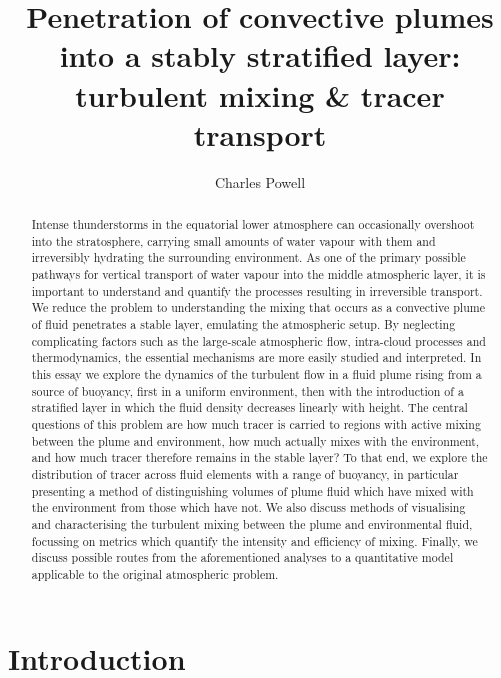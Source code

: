 \documentclass[a4paper]{article}
\title{\bf Penetration of convective plumes into a stably stratified layer: turbulent mixing \& tracer
	transport}
\author{Charles Powell}
\begin{document}
\maketitle

\begin{abstract}
	Intense thunderstorms in the equatorial lower atmosphere can occasionally overshoot into the stratosphere,
	carrying small amounts of water vapour with them and irreversibly hydrating the surrounding environment.
	As one of the primary possible pathways for vertical transport of water vapour into the middle atmospheric
	layer, it is important to understand and quantify the processes resulting in irreversible transport. We
	reduce the problem to understanding the mixing that occurs as a convective plume of fluid penetrates a
	stable layer, emulating the atmospheric setup.  By neglecting complicating factors such as the large-scale
	atmospheric flow, intra-cloud processes and thermodynamics, the essential mechanisms are more easily
	studied and interpreted. In this essay we explore the dynamics of the turbulent flow in a fluid plume
	rising from a source of buoyancy, first in a uniform environment, then with the introduction of a
	stratified layer in which the fluid density decreases linearly with height. The central questions of this
	problem are how much tracer is carried to regions with active mixing between the plume and environment,
	how much actually mixes with the environment, and how much tracer therefore remains in the stable layer?
	To that end, we explore the distribution of tracer across fluid elements with a range of buoyancy, in
	particular presenting a method of distinguishing volumes of plume fluid which have mixed with the
	environment from those which have not. We also discuss methods of visualising and characterising the
	turbulent mixing between the plume and environmental fluid, focussing on metrics which quantify the
	intensity and efficiency of mixing. Finally, we discuss possible routes from the aforementioned analyses
	to a quantitative model applicable to the original atmospheric problem.
\end{abstract}


\section{Introduction}
\end{document}

